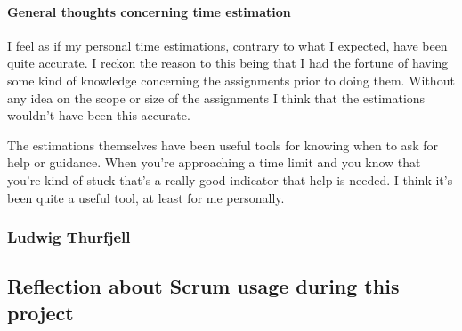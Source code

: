 \paragraph{General thoughts concerning time estimation}

I feel as if my personal time estimations, contrary to what I expected, have been quite accurate. I reckon the reason to this being that I had the fortune of having some kind of knowledge concerning the assignments prior to doing them. Without any idea on the scope or size of the assignments I think that the estimations wouldn't have been this accurate.

The estimations themselves have been useful tools for knowing when to ask for help or guidance. When you're approaching a time limit and you know that you're kind of stuck that's a really good indicator that help is needed. I think it's been quite a useful tool, at least for me personally.

\subsubsection{Ludwig Thurfjell}
\subsection{Reflection about Scrum usage during this project}
